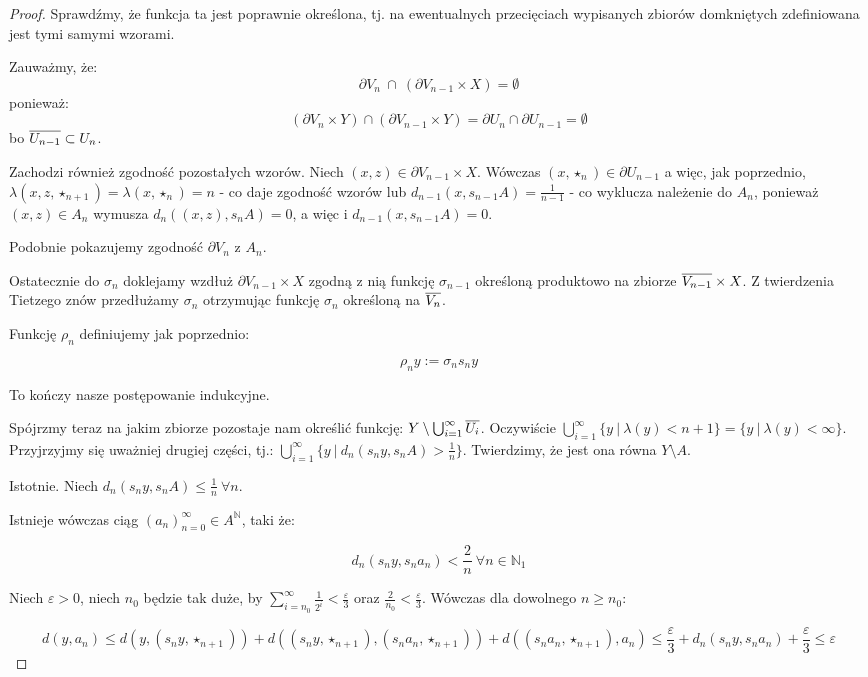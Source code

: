 \begin{thm}
\begin{proof}
  Sprawdźmy, że funkcja ta jest poprawnie określona, tj. na ewentualnych przecięciach wypisanych zbiorów domkniętych zdefiniowana jest tymi samymi wzorami.
  
  Zauważmy, że:
  $$\partial V_n\ \cap\ (\partial V_{n-1} \times X) = \emptyset$$
  ponieważ:
  $$(\partial V_n \times Y) \cap (\partial V_{n-1} \times Y) = \partial U_n \cap \partial U_{n-1} = \emptyset$$
  bo $\overline{U_{n-1}} \subset U_n$.
  
  Zachodzi również zgodność pozostałych wzorów. Niech $(x, z) \in \partial V_{n-1} \times X$. Wówczas $(x, \star_n) \in \partial U_{n-1}$ a więc, jak poprzednio, $\lambda(x, z, \star_{n+1}) = \lambda(x, \star_n) = n$ - co daje zgodność wzorów lub $d_{n-1}(x, s_{n-1} A) = \frac{1}{n-1}$ - co wyklucza należenie do $A_n$, ponieważ $(x, z) \in A_n$ wymusza $d_{n}((x, z), s_{n} A) = 0$, a więc i $d_{n-1}(x, s_{n-1} A) = 0$.
  
  Podobnie pokazujemy zgodność $\partial V_n$ z $A_n$.
  
  Ostatecznie do $\sigma_n$ doklejamy wzdłuż $\partial V_{n-1} \times X$ zgodną z nią funkcję $\sigma_{n-1}$ określoną produktowo na zbiorze $\overline{V_{n-1}} \times X$. Z twierdzenia Tietzego znów przedłużamy $\sigma_n$ otrzymując funkcję $\sigma_n$ określoną na $\overline{V_n}$.
  
  Funkcję $\rho_n$ definiujemy jak poprzednio:
  
  $$\rho_n y := \sigma_n s_n y$$
  
  To kończy nasze postępowanie indukcyjne.

  Spójrzmy teraz na jakim zbiorze pozostaje nam określić funkcję: $Y \setminus \bigcup_{i=1}^\infty \overline{U_i}$. Oczywiście $\bigcup_{i=1}^\infty \{y\ |\ \lambda(y) < n+1\} = \{y\ |\ \lambda(y) < \infty\}$. Przyjrzyjmy się uważniej drugiej części, tj.: $\bigcup_{i=1}^\infty \{y\ |\ d_n(s_n y, s_n A) > \frac{1}{n}\}$. Twierdzimy, że jest ona równa $Y \setminus A$.
  
  Istotnie. Niech $d_n(s_n y, s_n A) \leq \frac{1}{n}\ \forall n$.
  
  Istnieje wówczas ciąg $(a_n)_{n=0}^\infty \in A^\mathbb{N}$, taki że:
  
  $$d_n(s_n y, s_n a_n) < \frac{2}{n}\ \forall n \in \mathbb{N}_1$$
  
  Niech $\varepsilon > 0$, niech $n_0$ będzie tak duże, by $\sum_{i=n_0}^\infty \frac{1}{2^i}< \frac{\varepsilon}{3}$ oraz $\frac{2}{n_0} < \frac{\varepsilon}{3}$. Wówczas dla dowolnego $n \geq n_0$:
  
  $$d(y, a_n) \leq d(y, (s_n y, \star_{n+1})) + d((s_n y, \star_{n+1}), (s_n a_n, \star_{n+1})) + d((s_n a_n, \star_{n+1}), a_n) \leq \frac{\varepsilon}{3} + d_n(s_n y, s_n a_n) + \frac{\varepsilon}{3} \leq \varepsilon$$
  

\end{proof}
\end{thm}
